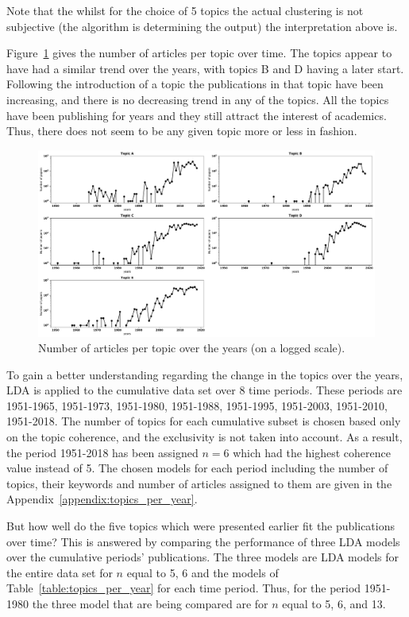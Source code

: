 \documentclass{article}
\theoremstyle{definition}
\begin{document}
Note that the whilst for the choice of 5 topics the actual clustering is not
subjective (the algorithm is determining the output) the interpretation above is.

Figure~\ref{fig:number_of_articles_per_topic} gives the number of articles
per topic over time. The topics appear to have had a similar trend over the years,
with topics B and D having a later start. Following the introduction of a topic
the publications in that topic have been increasing, and there is no decreasing
trend in any of the topics. All the topics have been publishing for years and
they still attract the interest of academics. Thus, there does not
seem to be any given topic more or less in fashion.

\begin{figure}[!hbtp]
    \centering
    \includegraphics[width=\textwidth]{papers_per_topic_over_time.pdf}
    \caption{Number of articles per topic over the years (on a logged scale).}\label{fig:number_of_articles_per_topic}
\end{figure}

To gain a better understanding regarding the change in the topics over the years,
LDA is applied to the cumulative data set over 8 time periods. These periods are
1951-1965, 1951-1973, 1951-1980, 1951-1988, 1951-1995, 1951-2003, 1951-2010,
1951-2018. The number of topics for each cumulative subset is chosen based only
on the topic coherence, and the exclusivity is not taken into account. As a result,
the period 1951-2018 has been assigned \(n=6\) which had the highest coherence
value instead of 5. The chosen models for each period including the
number of topics, their keywords and number of articles assigned to them are
given in the Appendix~\ref{appendix:topics_per_year}.

But how well do the five topics which were presented earlier fit the
publications over time? This is answered by comparing the performance of three
LDA models over the cumulative periods' publications. The three models are LDA
models for the entire data set for \(n\) equal to 5, 6 and the models of
Table~\ref{table:topics_per_year} for each time period. Thus, for the period
1951-1980 the three model that are being compared are for $n$ equal to 5, 6, and
13.
\end{document}
